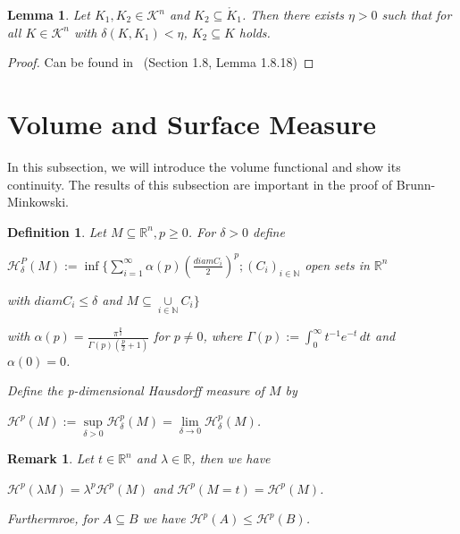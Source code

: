 \documentclass[a4paper]{book}
\newtheorem{lemma}[theorem]{Lemma}%
\newtheorem{remark}{Remark}%
\newtheorem{definition}{Definition}%
\begin{document}
\begin{lemma}
    Let $K_{1},K_{2}\in\mathscr{K}^{n}$ and $K_{2}\subseteq\mathring{K}_{1}$. Then there exists $\eta>0$ such that for all $K\in\mathscr{K}^{n}$ with $\delta(K,K_{1})<\eta$, $K_{2}\subseteq K$ holds.
\end{lemma}
\begin{proof}
    Can be found in~\cite{schneider2014convex} (Section 1.8, Lemma 1.8.18)
\end{proof}
    
\section{Volume and Surface Measure}
In this subsection, we will introduce the volume functional and show its continuity. The results of this subsection are important in the proof of Brunn-Minkowski.

\begin{definition}
	Let $M\subseteq\mathbb{R}^{n}, p\geq0$. For $\delta>0$ define
	\begin{center}
		$\displaystyle \mathscr{H}_{\delta}^{P}(M):=\inf\{\sum\limits_{i=1}^{\infty}\alpha(p)(\frac{diam C_{i}}{2})^{p};(C_{i})_{i\in\mathbb{N}}$ open sets in $\mathbb{R}^n$

		\hspace{1cm}with $diam C_{i}\leq\delta$ and $M\subseteq\underset{i\in\mathbb{N}}{\cup}{C_{i}}\}$
	\end{center}
	with $\alpha(p)=\frac{\pi^{\frac{p}{2}}}{\Gamma(p)(\frac{p}{2}+1)}$ for $p\neq0$, where $\Gamma(p):=\int_{0}^{\infty}t^{-1}e^{-t}\,dt$ and $\alpha(0)=0$.
	
	Define the p-dimensional Hausdorff measure of $M$ by
	\begin{center}
		$\mathscr{H}^{p}(M):=\underset{\delta>0}{\sup}\mathscr{H}_{\delta}^{p}(M)=\underset{\delta\to0}{\lim}\mathscr{H}_{\delta}^{p}(M)$.
	\end{center}
\end{definition}

\begin{remark}
	Let $t\in\mathbb{R}^{n}$ and $\lambda\in\mathbb{R}$, then we have
	\begin{center}
		$\mathscr{H}^{p}(\lambda M)=\lambda^{p}\mathscr{H}^{p}(M)$ and $\mathscr{H}^{p}(M=t)=\mathscr{H}^{p}(M)$.
	\end{center}
	Furthermroe, for $A\subseteq B$ we have $\mathscr{H}^{p}(A)\leq\mathscr{H}^{p}(B)$.
\end{remark}
\end{document}
